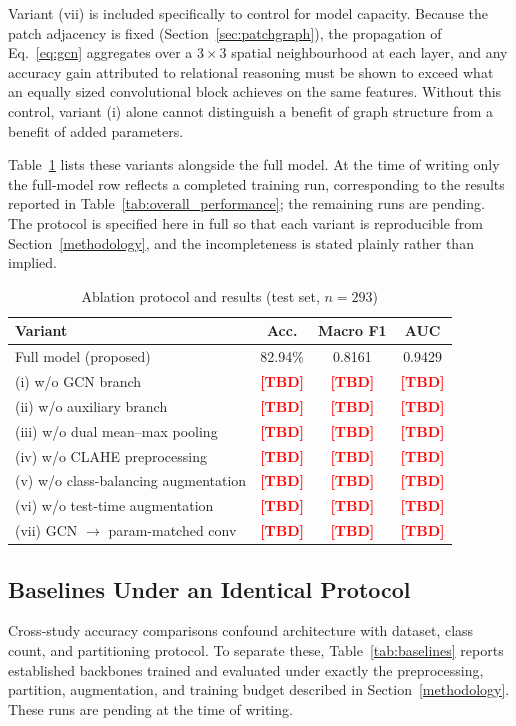 \documentclass[journal]{IEEEtran}
\newcommand{\PEND}{\textcolor{red}{\textbf{[TBD]}}}
\begin{document}
Variant (vii) is included specifically to control for model capacity. Because
the patch adjacency is fixed (Section~\ref{sec:patchgraph}), the propagation of
Eq.~\eqref{eq:gcn} aggregates over a $3\times3$ spatial neighbourhood at each
layer, and any accuracy gain attributed to relational reasoning must be shown to
exceed what an equally sized convolutional block achieves on the same features.
Without this control, variant (i) alone cannot distinguish a benefit of graph
structure from a benefit of added parameters.

Table~\ref{tab:ablation} lists these variants alongside the full model. At the
time of writing only the full-model row reflects a completed training run,
corresponding to the results reported in
Table~\ref{tab:overall_performance}; the remaining runs are pending. The
protocol is specified here in full so that each variant is reproducible from
Section~\ref{methodology}, and the incompleteness is stated plainly rather than
implied.

\begin{table}[!t]
\centering
\caption{Ablation protocol and results (test set, $n=293$)}
\label{tab:ablation}
\footnotesize
\begin{tabular}{@{}l c c c@{}}
\toprule
\textbf{Variant} & \textbf{Acc.} & \textbf{Macro F1} & \textbf{AUC} \\
\midrule
Full model (proposed) & 82.94\% & 0.8161 & 0.9429 \\
(i) w/o GCN branch & \PEND & \PEND & \PEND \\
(ii) w/o auxiliary branch & \PEND & \PEND & \PEND \\
(iii) w/o dual mean--max pooling & \PEND & \PEND & \PEND \\
(iv) w/o CLAHE preprocessing & \PEND & \PEND & \PEND \\
(v) w/o class-balancing augmentation & \PEND & \PEND & \PEND \\
(vi) w/o test-time augmentation & \PEND & \PEND & \PEND \\
(vii) GCN $\rightarrow$ param-matched conv & \PEND & \PEND & \PEND \\
\bottomrule
\end{tabular}
\end{table}

\subsection{Baselines Under an Identical Protocol}
\label{sec:baselines}
Cross-study accuracy comparisons confound architecture with dataset, class
count, and partitioning protocol. To separate these, Table~\ref{tab:baselines}
reports established backbones trained and evaluated under exactly the
preprocessing, partition, augmentation, and training budget described in
Section~\ref{methodology}. These runs are pending at the time of writing.
\end{document}

